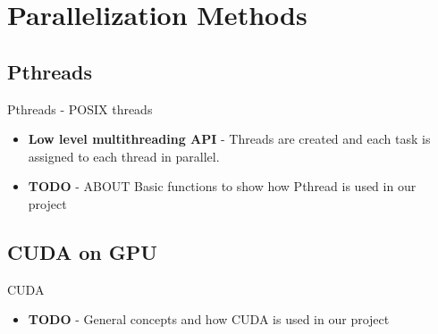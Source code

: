 \section{Parallelization Methods}
    \subsection{Pthreads}
        \begin{frame}{Pthreads - POSIX threads}
            \begin{itemize}
                \item {
                    \textbf{Low level multithreading API} - Threads are created and each task is assigned to each thread in parallel.
                    }
                \item {
                    \textbf{TODO} - ABOUT Basic functions to show how Pthread is used in our project
                    }
            \end{itemize}
        \end{frame}
        

    \subsection{CUDA on GPU}
        \begin{frame}{CUDA}
          \begin{itemize}
              \item {
               \textbf{TODO} - General concepts and how CUDA is used in our project
                    }
          \end{itemize}
        \end{frame}
    
